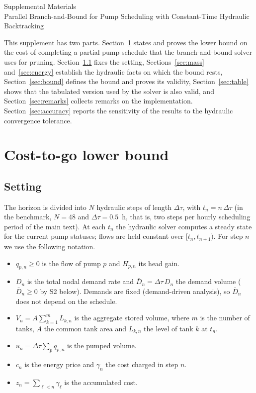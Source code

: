 \documentclass[11pt]{article}
\theoremstyle{remark}
\newcommand{\dtau}{\Delta\tau}
\begin{document}
\begin{center}
  {\Large Supplemental Materials}\\[0.75em]
  {\large Parallel Branch-and-Bound for Pump Scheduling with Constant-Time Hydraulic Backtracking}
\end{center}
\vspace{1em}

This supplement has two parts. Section~\ref{sec:proof} states and proves the lower bound
on the cost of completing a partial pump schedule that the branch-and-bound solver uses
for pruning. Section~\ref{sec:setting} fixes the setting, Sections~\ref{sec:mass}
and~\ref{sec:energy} establish the hydraulic facts on which the bound rests,
Section~\ref{sec:bound} defines the bound and proves its validity,
Section~\ref{sec:table} shows that the tabulated version used by the solver is also
valid, and Section~\ref{sec:remarks} collects remarks on the implementation.
Section~\ref{sec:accuracy} reports the sensitivity of the results to the hydraulic
convergence tolerance.

\section{Cost-to-go lower bound}\label{sec:proof}

\subsection{Setting}\label{sec:setting}

The horizon is divided into $N$ hydraulic steps of length $\dtau$, with $t_n = n\,\dtau$
(in the benchmark, $N = 48$ and $\dtau = 0.5$~h, that is, two steps per hourly
scheduling period of the main text). At each $t_n$ the hydraulic solver
computes a steady state for the current pump statuses; flows are held constant over
$[t_n, t_{n+1})$. For step $n$ we use the following notation.
\begin{itemize}
  \item $q_{p,n} \ge 0$ is the flow of pump $p$ and $H_{p,n}$ its head gain.
  \item $D_n$ is the total nodal demand rate and $\bar D_n = \dtau\, D_n$ the demand
    volume ($\bar D_n \ge 0$ by S2 below). Demands are fixed (demand-driven analysis), so
    $\bar D_n$ does not depend on the schedule.
  \item $V_n = A \sum_{k=1}^{m} L_{k,n}$ is the aggregate stored volume, where $m$ is the
    number of tanks, $A$ the common tank area and $L_{k,n}$ the level of tank $k$ at $t_n$.
  \item $u_n = \dtau \sum_p q_{p,n}$ is the pumped volume.
  \item $c_n$ is the energy price and $\gamma_n$ the cost charged in step $n$.
  \item $z_n = \sum_{\ell < n} \gamma_\ell$ is the accumulated cost.
\end{itemize}
\end{document}
